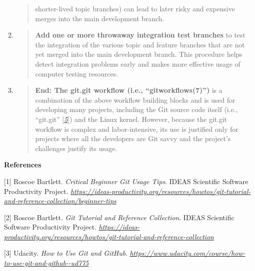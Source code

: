 \documentclass[]{article}
\begin{document}
\begin{enumerate}
\begin{quote}
  shorter-lived topic branches) can lead to later risky and expensive
  merges into the main development branch.
  \end{quote}
\item
  \begin{quote}
  \textbf{Add one or more throwaway integration test branches} to test
  the integration of the various topic and feature branches that are not
  yet merged into the main development branch. This procedure helps
  detect integration problems early and makes more effective usage of
  computer testing resources.
  \end{quote}
\item
  \begin{quote}
  \textbf{End: The git.git workflow (i.e., ``gitworkflows(7)'')} is a
  combination of the above workflow building blocks and is used for
  developing many projects, including the Git source code itself (i.e.,
  ``git.git'' {[}\protect\hyperlink{id.m6th6vxlbrrd}{\emph{5}}{]}) and
  the Linux kernel. However, because the git.git workflow is complex and
  labor-intensive, its use is justified only for projects where all the
  developers are Git savvy and the project's challenges justify its
  usage.
  \end{quote}
\end{enumerate}

\protect\hypertarget{h.9qg5mj337055}{}{}\textbf{References}

\protect\hypertarget{h.f53m6pxt4rgc}{}{\protect\hypertarget{id.pmt7367owle1}{}{}}{[}1{]}
Roscoe Bartlett. \emph{Critical Beginner Git Usage Tips}. IDEAS
Scientific Software Productivity Project.
\href{https://ideas-productivity.org/resources/howtos/git-tutorial-and-reference-collection/beginner-tips}{\emph{https://ideas-productivity.org/resources/howtos/git-tutorial-and-reference-collection/beginner-tips}}

\protect\hypertarget{id.dpuheqwt966g}{}{}{[}2{]} Roscoe Bartlett.
\emph{Git Tutorial and Reference Collection}. IDEAS Scientific Software
Productivity Project.
\href{https://ideas-productivity.org/resources/howtos/git-tutorial-and-reference-collection}{\emph{https://ideas-productivity.org/resources/howtos/git-tutorial-and-reference-collection}}

\protect\hypertarget{id.91we93wr27j3}{}{}{[}3{]} Udacity. \emph{How to
Use Git and GitHub}.
\href{https://www.udacity.com/course/how-to-use-git-and-github--ud775}{\emph{https://www.udacity.com/course/how-to-use-git-and-github-\/-ud775}}
\end{document}
